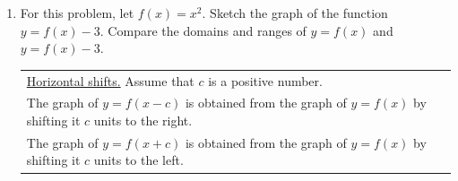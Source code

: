 \documentclass[11pt]{article}
\begin{document}
\begin{enumerate}

\item For this problem, let $f(x)=x^2$. Sketch the graph of the function $y=f(x) - 3$. Compare the domains and ranges of $y=f(x)$ and $y=f(x)-3$.





\newpage
\hspace{-.4in} \begin{tabular}{| l |} \hline \underline{Horizontal shifts.} Assume that $c$ is a positive number. \\
The graph of $y = f(x-c)$ is obtained from the graph of $y=f(x)$ by shifting it $c$ units to the right. \\
The graph of $y = f(x+c)$ is obtained from the graph of $y=f(x)$ by shifting it $c$ units to the left.
 \\ \hline
\end{tabular} 


\end{enumerate}
\end{document}
